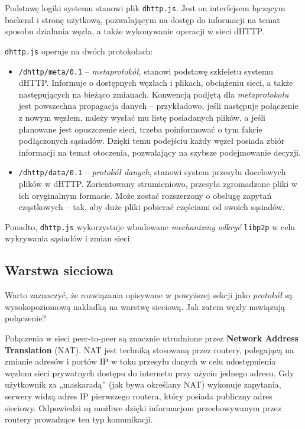 Podstawę logiki systemu stanowi plik \texttt{dhttp.js}. Jest on interfejsem łączącym backend i stronę użytkową, pozwalającym na dostęp do informacji na temat sposobu działania węzła, a także wykonywanie operacji w sieci dHTTP.

\texttt{dhttp.js} operuje na dwóch protokołach:

\begin{itemize}
    \item \texttt{/dhttp/meta/0.1} -- {\em metaprotokół}, stanowi podstawę szkieletu systemu dHTTP. Informuje o dostępnych węzłach i plikach, obciążeniu sieci, a także następujących na bieżąco zmianach. Konwencją podjętą dla {\em metaprotokołu} jest powszechna propagacja danych -- przykładowo, jeśli następuje połączenie z nowym węzłem,  należy wysłać mu listę posiadanych plików, a jeśli planowane jest opuszczenie sieci, trzeba poinformować o tym fakcie podłączonych sąsiadów. Dzięki temu podejściu każdy węzeł posiada zbiór informacji na temat otoczenia, pozwalający na szybsze podejmowanie decyzji.

    \item \texttt{/dhttp/data/0.1} -- {\em protokół danych}, stanowi system przesyłu docelowych plików w dHTTP. Zorientowany strumieniowo, przesyła zgromadzone pliki w ich oryginalnym formacie. Może zostać rozszerzony o obsługę zapytań cząstkowych -- tak, aby duże pliki pobierać częściami od swoich sąsiadów.
\end{itemize}
Ponadto, \texttt{dhttp.js} wykorzystuje wbudowane {\em mechanizmy odkryć} \texttt{libp2p} w celu wykrywania sąsiadów i zmian sieci.



\subsection{Warstwa sieciowa}
Warto zaznaczyć, że rozwiązania opisywane w powyższej sekcji jako {\em protokół} są wysokopoziomową nakładką na warstwę sieciową. Jak zatem węzły nawiązują połączenie?

Połączenia w sieci peer-to-peer są znacznie utrudnione przez \textbf{ Network Address Translation} (NAT). NAT jest techniką stosowaną przez routery, polegającą na zmianie adresów i portów IP w toku przesyłu danych w celu udostępnienia węzłom sieci prywatnych dostępu do internetu przy użyciu jednego adresu. Gdy użytkownik za „maskaradą” (jak bywa określany NAT) wykonuje zapytania, serwery widzą adres IP pierwszego routera, który posiada publiczny adres sieciowy. Odpowiedzi są możliwe dzięki informacjom przechowywanym przez routery prowadzące ten typ komunikacji.

